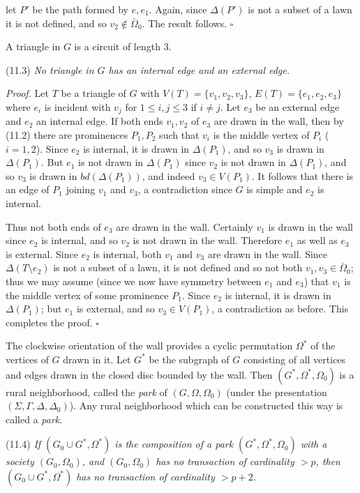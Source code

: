 \noindent let $P'$ be the path formed by $e, e_1$. Again, since $\Delta(P')$ is not a subset of a lawn it is not defined, and so $v_2 \notin \bar{\Omega}_0$. The result follows. $\square$

A triangle in $G$ is a circuit of length 3.

\stmt
(11.3) \textit{No triangle in $G$ has an internal edge and an external edge.}

\textit{Proof.} Let $T$ be a triangle of $G$ with $V(T) = \{v_1, v_2, v_3\}$, $E(T) = \{e_1, e_2, e_3\}$ where $e_i$ is incident with $v_j$ for $1 \le i, j \le 3$ if $i \ne j$. Let $e_3$ be an external edge and $e_2$ an internal edge. If both ends $v_1, v_2$ of $e_3$ are drawn in the wall, then by (11.2) there are prominences $P_1, P_2$ such that $v_i$ is the middle vertex of $P_i$ ($i = 1, 2$). Since $e_2$ is internal, it is drawn in $\Delta(P_1)$, and so $v_3$ is drawn in $\Delta(P_1)$. But $e_1$ is not drawn in $\Delta(P_1)$ since $v_2$ is not drawn in $\Delta(P_1)$, and so $v_3$ is drawn in $bd(\Delta(P_1))$, and indeed $v_3 \in V(P_1)$. It follows that there is an edge of $P_1$ joining $v_1$ and $v_3$, a contradiction since $G$ is simple and $e_2$ is internal.

Thus not both ends of $e_3$ are drawn in the wall. Certainly $v_1$ is drawn in the wall since $e_2$ is internal, and so $v_2$ is not drawn in the wall. Therefore $e_1$ as well as $e_3$ is external. Since $e_2$ is internal, both $v_1$ and $v_3$ are drawn in the wall. Since $\Delta(T \setminus e_2)$ is not a subset of a lawn, it is not defined and so not both $v_1, v_3 \in \bar{\Omega}_0$; thus we may assume (since we now have symmetry between $e_1$ and $e_3$) that $v_1$ is the middle vertex of some prominence $P_1$. Since $e_2$ is internal, it is drawn in $\Delta(P_1)$; but $e_1$ is external, and so $v_3 \in V(P_1)$, a contradiction as before. This completes the proof. $\square$

The clockwise orientation of the wall provides a cyclic permutation $\Omega^*$ of the vertices of $G$ drawn in it. Let $G^*$ be the subgraph of $G$ consisting of all vertices and edges drawn in the closed disc bounded by the wall. Then $(G^*, \Omega^*, \Omega_0)$ is a rural neighborhood, called the \textit{park} of $(G, \Omega, \Omega_0)$ (under the presentation $(\Sigma, \Gamma, \Delta, \Delta_0)$). Any rural neighborhood which can be constructed this way is called a \textit{park}.

\stmt
(11.4) \textit{If $(G_0 \cup G^*, \Omega^*)$ is the composition of a park $(G^*, \Omega^*, \Omega_0)$ with a society $(G_0, \Omega_0)$, and $(G_0, \Omega_0)$ has no transaction of cardinality $> p$, then $(G_0 \cup G^*, \Omega^*)$ has no transaction of cardinality $> p + 2$.}

